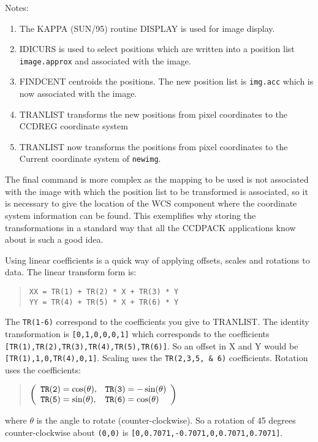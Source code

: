 \documentclass[twoside,11pt]{article}
\newcommand{\htmlref}[2]{#1}
\newcommand{\latexhtml}[2]{#1}
\newcommand{\xref}[3]{#1}
\renewcommand{\_}{\texttt{\symbol{95}}}
\newcommand{\ttsize}{\latexhtml{\small}{}}
\newenvironment{myquote}{\begin{quote}\ttsize}{\end{quote}}
\newcommand{\text}[1]{{\ttsize \tt #1}}
\newcommand{\routine}[1]{{\sc #1}}
\newcommand{\xroutine}[1]{\htmlref{{\sc #1}}{#1}}
\begin{document}
Notes:
\begin{enumerate}
\item The \xref{KAPPA (SUN/95)}{sun95}{} routine \xref{DISPLAY}{sun95}{DISPLAY}
is used for image display.
\item \xroutine{IDICURS} is used to select positions which are written into a
position list \text{image.approx} and associated with the image.
\item \xroutine{FINDCENT} centroids the positions. The new position list is
\text{img.acc} which is now associated with the image.
\item \xroutine{TRANLIST} transforms the new positions from pixel coordinates
to the CCD\_REG coordinate system
\item \xroutine{TRANLIST} now transforms the positions from pixel 
coordinates to the Current coordinate system of \text{newimg}.
\end{enumerate}
The final command is more complex as the mapping to be used is not
associated with the image with which the position list to be transformed
is associated, so it is necessary to give the location of the WCS
component where the coordinate system information can be found.  
This exemplifies why storing the transformations in 
a standard way that all the CCDPACK applications know about is 
such a good idea.

Using linear coefficients is a quick way of applying offsets, scales and
rotations to data. The linear transform form is:
\begin{myquote}
\begin{verbatim}
XX = TR(1) + TR(2) * X + TR(3) * Y
YY = TR(4) + TR(5) * X + TR(6) * Y
\end{verbatim}
\end{myquote}
The \text{TR(1-6)} correspond to the coefficients you give to
\routine{TRANLIST}.
The identity transformation is \text{[0,1,0,0,0,1]} which corresponds
to the coefficients \text{[TR(1),TR(2),TR(3),TR(4),TR(5),TR(6)]}.
So an offset in X and Y would be \text{[TR(1),1,0,TR(4),0,1]}.
Scaling uses the \text{TR(2,3,5, \& 6)} coefficients.
Rotation uses the coefficients:
\begin{myquote}
\(
\left(
     \begin{array}{ll}
        \text{TR(2)} = \cos(\theta), & \text{TR(3)} = -\sin(\theta) \\
        \text{TR(5)} = \sin(\theta), & \text{TR(6)} = \cos(\theta) \\
     \end{array}
\right)
\)
\end{myquote}
where $\theta$ is the angle to rotate (counter-clockwise). So a rotation
of 45 degrees counter-clockwise about \text{(0,0)} is
\text{[0,0.7071,-0.7071,0,0.7071,0.7071]}.
\end{document}
